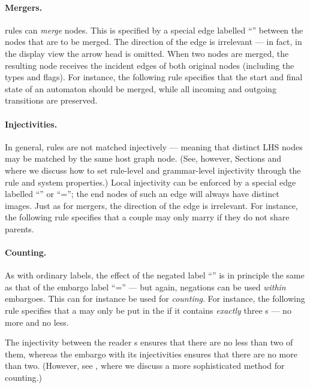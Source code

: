 \paragraph{Mergers.}

\GROOVE rules can \emph{merge} nodes. This is specified by a special edge
labelled ``\newP\lab{=}'' between the nodes that are to be merged. The
direction of the edge is irrelevant --- in fact, in the display view the arrow
head is omitted. When two nodes are merged, the resulting
node receives the incident edges of both original nodes (including the
types and flags). For instance, the following rule specifies that the start
and final state of an automaton should be merged, while all incoming and
outgoing transitions are preserved.


\paragraph{Injectivities.}

In general, rules are not matched injectively --- meaning that distinct LHS
nodes may be matched by the same host graph node. (See, however, Sections
 and~ where we discuss how
to set rule-level and grammar-level injectivity through the rule and system
properties.) Local injectivity can be enforced by a special edge labelled
``\lab{!=}'' or ``\notP\lab=''; the end nodes of such an edge will always have
distinct images. Just as for mergers, the direction of the edge is
irrelevant. For instance, the following rule specifies that a couple may only
marry if they do not share parents.


\paragraph{Counting.}

As with ordinary labels, the effect of the negated label ``\lab{!=}'' is in
principle the same as that of the embargo label ``\notP\lab='' --- but again,
negations can be used \emph{within} embargoes. This can for instance be used
for \emph{counting}. For instance, the following rule specifies that a
 may only be put in the  if it contains \emph{exactly}
three s --- no more and no less.

%
The injectivity between the reader s ensures that there are no less
than two of them, whereas the embargo  with its injectivities
ensures that there are no more than two. (However, see , where we
discuss a more sophisticated method for counting.)

